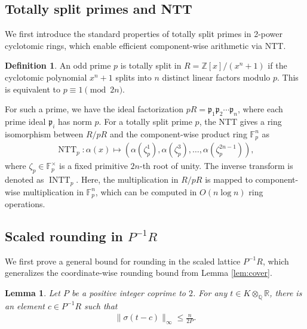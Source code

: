 \documentclass[11pt,a4paper]{article}
\theoremstyle{plain}
\newtheorem{lemma}[theorem]{Lemma}
\theoremstyle{definition}
\newtheorem{definition}[theorem]{Definition}
\theoremstyle{remark}
\DeclareMathOperator{\NTT}{NTT}
\DeclareMathOperator{\INTT}{INTT}
\newcommand{\Z}{\mathbb{Z}}
\newcommand{\Q}{\mathbb{Q}}
\newcommand{\R}{\mathbb{R}}
\newcommand{\F}{\mathbb{F}}
\newcommand{\fp}{\mathfrak{p}}
\begin{document}
\subsection{Totally split primes and NTT}\label{subsec:split-primes}

We first introduce the standard properties of totally split primes in 2-power cyclotomic rings, which enable efficient component-wise arithmetic via NTT.

\begin{definition}
An odd prime $p$ is totally split in $R=\Z[x]/(x^n+1)$ if the cyclotomic polynomial $x^n+1$ splits into $n$ distinct linear factors modulo $p$. This is equivalent to $p \equiv 1 \pmod{2n}$. 

\label{D:totalsplit}
\end{definition}

For such a prime, we have the ideal factorization $pR=\fp_1 \fp_2 \cdots \fp_n$, where each prime ideal $\fp_i$ has norm $p$. For a totally split prime $p$, the NTT gives a ring isomorphism between $R/pR$ and the component-wise product ring $\F_p^n$ as 
\begin{align}
  \NTT_p: \alpha(x) \mapsto (\alpha(\zeta_p^1), \alpha(\zeta_p^3), \dots, \alpha(\zeta_p^{2n-1})),
  \label{E:nttdef}
\end{align}
where $\zeta_p \in \F_p^\times$ is a fixed primitive $2n$-th root of unity. The inverse transform is denoted as $\INTT_p$. Here, the multiplication in $R/pR$ is mapped to component-wise multiplication in $\F_p^n$, which can be computed in $O(n\log n)$ ring operations. 

\subsection{Scaled rounding in $P^{-1}R$}

We first prove a general bound for rounding in the scaled lattice $P^{-1}R$, which generalizes the coordinate-wise rounding bound from Lemma \ref{lem:cover}.

\begin{lemma}
\label{lem:scalround}
Let $P$ be a positive integer coprime to $2$. For any $t \in K \otimes_\Q \R$, there is an element $c \in P^{-1}R$ such that
\begin{align}
\|\sigma(t-c)\|_\infty \le \frac{n}{2P}.
\label{E:scaleround}
\end{align}

\end{lemma}
\end{document}
